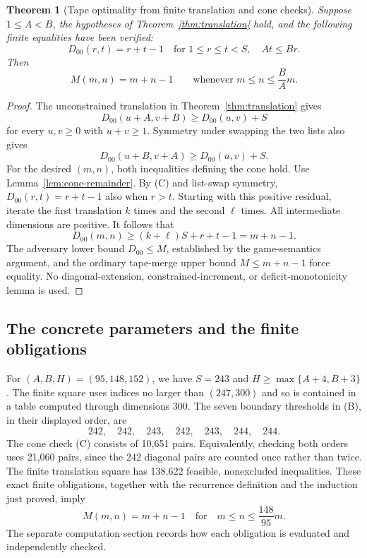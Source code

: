 \documentclass[11pt]{article}
\newtheorem{theorem}{Theorem}[section]
\theoremstyle{definition}
\theoremstyle{remark}
\begin{document}
\begin{theorem}[Tape optimality from finite translation and cone checks]
\label{thm:finite-cone-optimality}
Suppose $1\le A<B$, the hypotheses of Theorem~\ref{thm:translation} hold,
and the following finite equalities have been verified:
\begin{equation}
 D_{00}(r,t)=r+t-1
 \quad\text{for }1\le r\le t<S,\quad A t\le B r.
 \tag{C}
\end{equation}
Then
\[
 M(m,n)=m+n-1\qquad\text{whenever }m\le n\le\frac BA m.
\]
\end{theorem}
\begin{proof}
The unconstrained translation in Theorem~\ref{thm:translation} gives
\[
 D_{00}(u+A,v+B)\ge D_{00}(u,v)+S
\]
for every $u,v\ge0$ with $u+v\ge1$. Symmetry under swapping the two lists
also gives
\[
 D_{00}(u+B,v+A)\ge D_{00}(u,v)+S.
\]
For the desired $(m,n)$, both inequalities defining the cone hold.
Use Lemma~\ref{lem:cone-remainder}. By (C) and list-swap symmetry,
$D_{00}(r,t)=r+t-1$ also when $r>t$. Starting with this positive residual,
iterate the first translation $k$ times and the second $\ell$ times.
All intermediate dimensions are positive. It follows that
\[
 D_{00}(m,n)\ge(k+\ell)S+r+t-1=m+n-1.
\]
The adversary lower bound $D_{00}\le M$, established by the game-semantics
argument, and the ordinary tape-merge upper bound $M\le m+n-1$ force equality.
No diagonal-extension, constrained-increment, or deficit-monotonicity
lemma is used.
\end{proof}

\subsection{The concrete parameters and the finite obligations}
For $(A,B,H)=(95,148,152)$, we have $S=243$ and
$H\ge\max\{A+4,B+3\}$. The finite square uses indices no larger than
$(247,300)$ and so is contained in a table computed through dimensions 300.
The seven boundary thresholds in (B), in their displayed order, are
\[
 242,\quad242,\quad243,\quad242,\quad243,\quad244,\quad244.
\]
The cone check (C) consists of 10,651 pairs. Equivalently, checking both
orders uses 21,060 pairs, since the 242 diagonal pairs are counted once
rather than twice. The finite translation square has 138,622 feasible,
nonexcluded inequalities. These exact finite obligations, together with
the recurrence definition and the induction just proved, imply
\[
 \boxed{M(m,n)=m+n-1\quad\text{for}\quad m\le n\le\frac{148}{95}m.}
\]
The separate computation section records how each obligation is evaluated
and independently checked. 
\end{document}
